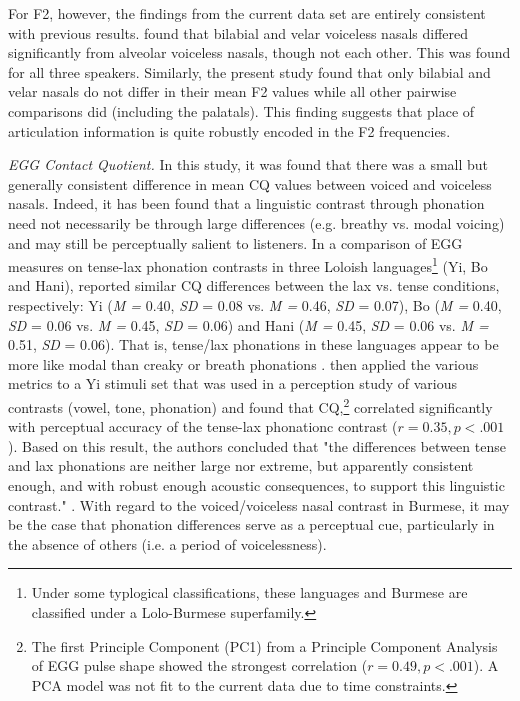 \documentclass[12pt]{article}
\begin{document}
For F2, however, the findings from the current data set are entirely consistent with previous results. \citet[][p. 5]{dantsuji1986some} found that bilabial and velar voiceless nasals differed significantly from alveolar voiceless nasals, though not each other. This was found for all three speakers. Similarly, the present study found that only bilabial and velar nasals do not differ in their mean F2 values while all other pairwise comparisons did (including the palatals). This finding suggests that place of articulation information is quite robustly encoded in the F2 frequencies.

\newpage
\emph{EGG Contact Quotient.}
In this study, it was found that there was a small but generally consistent difference in mean CQ values between voiced and voiceless nasals. Indeed, it has been found that a linguistic contrast through phonation need not necessarily be through large differences (e.g. breathy vs. modal voicing) and may still be perceptually salient to listeners. In a comparison of EGG measures on tense-lax phonation contrasts in three Loloish languages\footnote{Under some typlogical classifications, these languages and Burmese are classified under a Lolo-Burmese superfamily.} (Yi, Bo and Hani), \citet[][Appendix 2]{kuang2014vocal} reported similar CQ differences between the lax vs. tense conditions, respectively: Yi (\emph{M = } 0.40, \emph{SD} = 0.08 vs. \emph{M = } 0.46, \emph{SD} = 0.07), Bo (\emph{M = } 0.40, \emph{SD} = 0.06 vs. \emph{M = } 0.45, \emph{SD} = 0.06) and Hani (\emph{M = } 0.45, \emph{SD} = 0.06 vs. \emph{M = } 0.51, \emph{SD} = 0.06). That is, tense/lax phonations in these languages appear to be more like modal than creaky or breath phonations \citep[][p. 35]{kuang2014vocal}. \citet{kuang2014vocal} then applied the various metrics to a Yi stimuli set that was used in a perception study of various contrasts (vowel, tone, phonation) and found that CQ,\footnote{The first Principle Component (PC1) from a Principle Component Analysis of EGG pulse shape showed the strongest correlation ($r = 0.49, p < .001$). A PCA model was not fit to the current data due to time constraints.} correlated significantly with perceptual accuracy of the tense-lax phonationc contrast ($r = 0.35, p < .001$). Based on this result, the authors concluded that "the differences between tense and lax phonations are neither large nor extreme, but apparently consistent enough, and with robust enough acoustic consequences, to support this linguistic contrast." \citep[][p. 37]{kuang2014vocal}. With regard to the voiced/voiceless nasal contrast in Burmese, it may be the case that phonation differences serve as a perceptual cue, particularly in the absence of others (i.e. a period of voicelessness).
\end{document}
